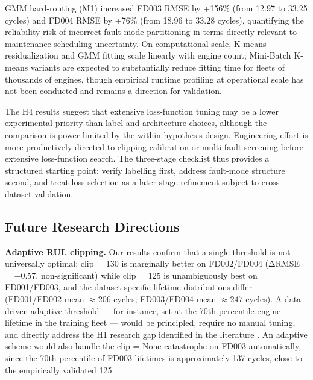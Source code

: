 \documentclass[preprint,10pt]{elsarticle}
\begin{document}
GMM hard-routing (M1) increased FD003 RMSE by +156\% (from 12.97 to 33.25 cycles) and FD004 RMSE by +76\% (from 18.96 to 33.28 cycles), quantifying the reliability risk of incorrect fault-mode partitioning in terms directly relevant to maintenance scheduling uncertainty. On computational scale, K-means residualization and GMM fitting scale linearly with engine count; Mini-Batch K-means variants are expected to substantially reduce fitting time for fleets of thousands of engines, though empirical runtime profiling at operational scale has not been conducted and remains a direction for validation.

The H4 results suggest that extensive loss-function tuning may be a lower experimental priority than label and architecture choices, although the comparison is power-limited by the within-hypothesis design. Engineering effort is more productively directed to clipping calibration or multi-fault screening before extensive loss-function search. The three-stage checklist thus provides a structured starting point: verify labelling first, address fault-mode structure second, and treat loss selection as a later-stage refinement subject to cross-dataset validation.

\subsection{Future Research Directions}

\textbf{Adaptive RUL clipping.} Our results confirm that a single threshold is not universally optimal: clip = 130 is marginally better on FD002/FD004 (ΔRMSE = −0.57, non-significant) while clip = 125 is unambiguously best on FD001/FD003, and the dataset-specific lifetime distributions differ (FD001/FD002 mean $\approx 206$ cycles; FD003/FD004 mean $\approx 247$ cycles). A data-driven adaptive threshold — for instance, set at the 70th-percentile engine lifetime in the training fleet — would be principled, require no manual tuning, and directly address the H1 research gap identified in the literature \cite{ref18,ref20}. An adaptive scheme would also handle the clip = None catastrophe on FD003 automatically, since the 70th-percentile of FD003 lifetimes is approximately 137 cycles, close to the empirically validated 125.
\end{document}
